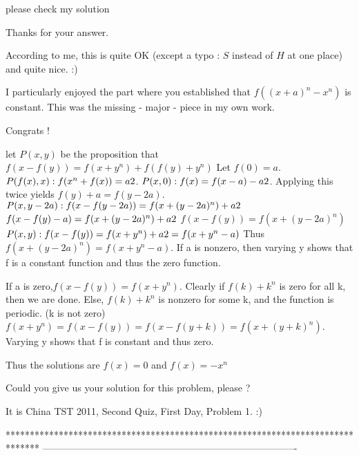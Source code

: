 \begin{solution}
	\begin{tcolorbox}please check my solution \end{tcolorbox}
Thanks for your answer.

According to me, this is quite OK (except a typo : $S$ instead of $H$ at one place) and quite nice. :)

I particularly enjoyed the part where you established that $f((x+a)^n-x^n)$ is constant. This was the missing  - major -  piece in my own work.

Congrats !
\end{solution}



\begin{solution}
	let $P(x,y)$ be the proposition that $f(x-f(y)) = f(x+y^n)+f(f(y)+y^n)$
Let $f(0)=a$.
$P(f(x),x): f(x^n+f(x)) = a\/2$.
$P(x,0): f(x) = f(x-a)-a\/2$.
Applying this twice yields $f(y)+a = f(y-2a)$.
$P(x,y-2a): f(x-f(y-2a)) = f(x+(y-2a)^n) + a\/2$
$f(x-f(y)-a) = f(x+(y-2a)^n) + a\/2$
$f(x-f(y)) = f(x+(y-2a)^n)$
$P(x,y): f(x-f(y)) = f(x+y^n)+a\/2 = f(x+y^n-a)$
Thus $f(x+(y-2a)^n)=f(x+y^n-a)$.
If a is nonzero, then varying y shows that f is a constant function and thus the zero function.

If a is zero,$f(x-f(y)) = f(x+y^n)$.
Clearly if $f(k)+k^n$ is zero for all k, then we are done.
Else, $f(k)+k^n$ is nonzero for some k, and the function is periodic. (k is not zero)
$f(x+y^n)=f(x-f(y))=f(x-f(y+k)) = f(x+(y+k)^n)$.
Varying y shows that f is constant and thus zero.

Thus the solutions are $f(x)=0$ and $f(x) = -x^n$
\end{solution}



\begin{solution}
	\begin{tcolorbox}
Could you give us your solution for this problem, please ?
\end{tcolorbox}

It is China TST 2011, Second Quiz, First Day, Problem 1. :)
\end{solution}
*******************************************************************************
-------------------------------------------------------------------------------

